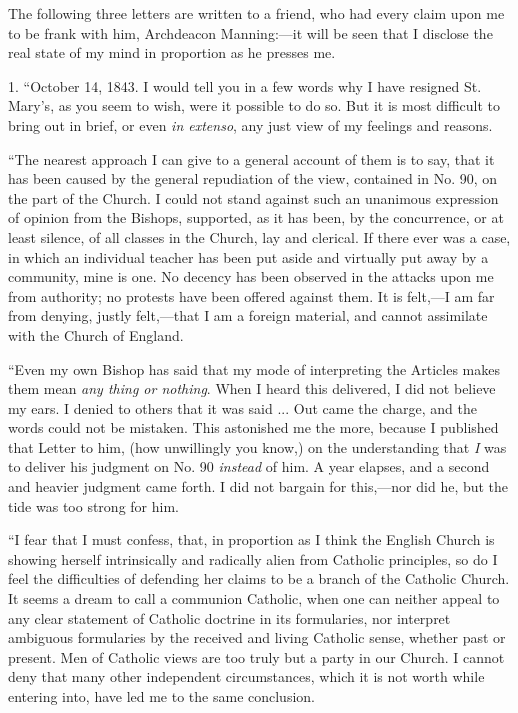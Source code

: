The following three letters are written to a friend, who had every
claim upon me to be frank with him, Archdeacon Manning:—it will be seen that I
disclose the real state of my mind in proportion as he
presses me.

1. ``October 14, 1843. I would tell you in a few words why I have
resigned St. Mary's, as you seem to wish, were it possible to do so. But
it is most difficult to bring out in brief, or even \emph{in extenso},
any just view of my feelings and reasons.

``The nearest approach I can give to a general account of them is
to say, that it has been caused by the general repudiation of the view,
contained in No. 90, on the part of the Church. I could not stand
against such an unanimous expression of opinion from the Bishops,
supported, as it has been, by the concurrence, or at least silence, of
all classes in the Church, lay and clerical. If there ever was a case,
in which an individual teacher has been put aside and virtually put away
by a community, mine is one. No decency has been observed in the attacks
upon me from authority; no protests have been offered against them. It
is felt,—I am far from denying, justly felt,—that I am a foreign
material, and cannot assimilate with the Church of England.

``Even my own Bishop has said that my mode of interpreting the
Articles makes them mean \emph{any thing or nothing}. When I heard this
delivered, I did not believe my ears. I denied to others that it was
said ... Out came the charge, and the words could not be mistaken. This
astonished me the more, because I published that Letter to him, (how unwillingly you know,) on the understanding that \emph{I} was to
deliver his judgment on No. 90 \emph{instead} of him. A year elapses, and
a second and heavier judgment came forth. I did not bargain for this,—nor
did he, but the tide was too strong for him.

``I fear that I must confess, that, in proportion as I think the
English Church is showing herself intrinsically and radically alien from
Catholic principles, so do I feel the difficulties of defending her
claims to be a branch of the Catholic Church. It seems a dream to call a
communion Catholic, when one can neither appeal to any clear statement
of Catholic doctrine in its formularies, nor interpret ambiguous
formularies by the received and living Catholic sense, whether past or
present. Men of Catholic views are too truly but a party in our Church.
I cannot deny that many other independent circumstances, which it is not
worth while entering into, have led me to the same conclusion.

